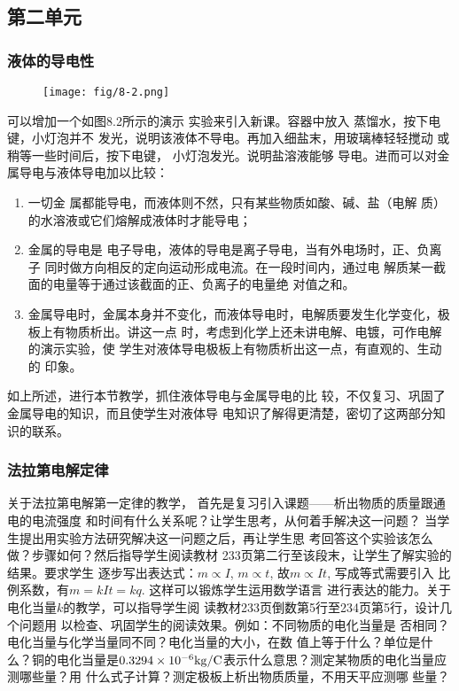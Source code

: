 \subsection{第二单元}
\subsubsection{液体的导电性}
\begin{figure}[htp]
    \centering
\texttt{[image: fig/8-2.png]}
    \caption{}
\end{figure}
可以增加一个如图8.2所示的演示
实验来引入新课。容器中放入
蒸馏水，按下电键，小灯泡并不
发光，说明该液体不导电。再加入细盐末，用玻璃棒轻轻搅动
或稍等一些时间后，按下电键，
小灯泡发光。说明盐溶液能够
导电。进而可以对金属导电与液体导电加以比较：
\begin{enumerate}
    \item 一切金
属都能导电，而液体则不然，只有某些物质如酸、碱、盐（电解
质）的水溶液或它们熔解成液体时才能导电；
\item 金属的导电是
电子导电，液体的导电是离子导电，当有外电场时，正、负离子
同时做方向相反的定向运动形成电流。在一段时间内，通过电
解质某一截面的电量等于通过该截面的正、负离子的电量绝
对值之和。
\item 金属导电时，金属本身并不变化，而液体导电时，电解质要发生化学变化，极板上有物质析出。讲这一点
时，考虑到化学上还未讲电解、电镀，可作电解的演示实验，使
学生对液体导电极板上有物质析出这一点，有直观的、生动的
印象。
\end{enumerate}

如上所述，进行本节教学，抓住液体导电与金属导电的比
较，不仅复习、巩固了金属导电的知识，而且使学生对液体导
电知识了解得更清楚，密切了这两部分知识的联系。

\subsubsection{法拉第电解定律}

关于法拉第电解第一定律的教学，
首先是复习引入课题——析出物质的质量跟通电的电流强度
和时间有什么关系呢？让学生思考，从何着手解决这一问题？
当学生提出用实验方法研究解决这一问题之后，再让学生思
考回答这个实验该怎么做？步骤如何？然后指导学生阅读教材
233页第二行至该段末，让学生了解实验的结果。要求学生
逐步写出表达式：$m\propto I$, $m\propto t$, 故$m\propto It$, 写成等式需要引入
比例系数，有$m=kIt=kq$. 这样可以锻炼学生运用数学语言
进行表达的能力。关于电化当量$k$的教学，可以指导学生阅
读教材233页倒数第5行至234页第5行，设计几个问题用
以检查、巩固学生的阅读效果。例如：不同物质的电化当量是
否相同？电化当量与化学当量同不同？电化当量的大小，在数
值上等于什么？单位是什么？铜的电化当量是$0.3294\times10^{-6}{\rm kg/C}$表示什么意思？测定某物质的电化当量应测哪些量？用
什么式子计算？测定极板上析出物质质量，不用天平应测哪
些量？

